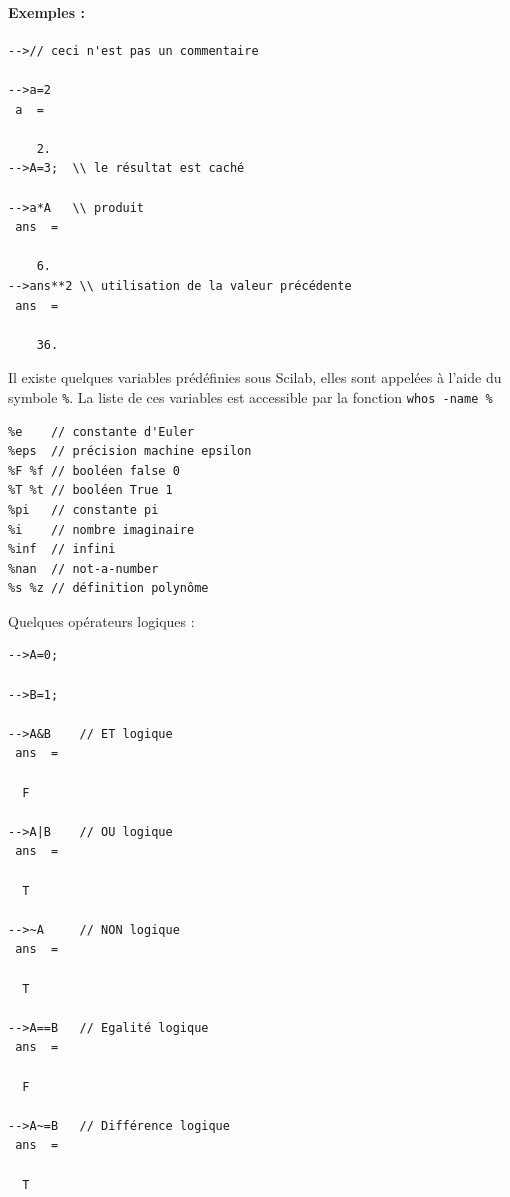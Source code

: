 \paragraph{Exemples :}
\begin{code}
\begin{verbatim}
-->// ceci n'est pas un commentaire

-->a=2
 a  =
      
    2. 
-->A=3;  \\ le résultat est caché

-->a*A   \\ produit
 ans  =

    6.  
-->ans**2 \\ utilisation de la valeur précédente
 ans  =
  
    36.  
\end{verbatim}
\end{code}

Il existe quelques variables prédéfinies sous Scilab, elles sont appelées à l'aide du symbole \og\verb?%?\fg.
La liste de ces variables est accessible par la fonction \verb?whos -name %?
\begin{code}
\begin{verbatim}
%e    // constante d'Euler
%eps  // précision machine epsilon
%F %f // booléen false 0 
%T %t // booléen True 1 
%pi   // constante pi
%i    // nombre imaginaire
%inf  // infini
%nan  // not-a-number
%s %z // définition polynôme
\end{verbatim}
\end{code}


Quelques opérateurs logiques : 
\begin{code}
\begin{verbatim}
-->A=0;

-->B=1;

-->A&B    // ET logique
 ans  =
 
  F 

-->A|B    // OU logique
 ans  =
 
  T 

-->~A     // NON logique
 ans  =
 
  T 

-->A==B   // Egalité logique
 ans  =
 
  F

-->A~=B   // Différence logique
 ans  =
 
  T
\end{verbatim}
\end{code}


